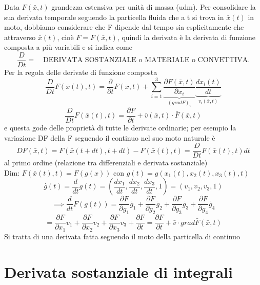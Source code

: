 \documentclass[a4paper,11pt]{report}
\newcommand{\x}{\bar{x}}
\newcommand{\xt}{\bar{x}(t)}
\newcommand{\vel}{\bar{v}}
\begin{document}
		Data $F(\x,t)$ grandezza estensiva per unità di massa (udm). Per consolidare la sua derivata temporale seguendo la particella fluida che a t si trova in $\x(t)$ in moto, dobbiamo considerare che F dipende dal tempo sia esplicitamente che attraverso $\x(t)$, cioè $F=F(\x,t)$, quindi la derivata è la derivata di funzione composta a più variabili e si indica come 
		$$
		\dfrac{D}{Dt} =\quad \textrm{DERIVATA SOSTANZIALE o MATERIALE o CONVETTIVA}.
		$$
		Per la regola delle derivate di funzione composta
		$$
		\dfrac{D}{Dt} F(\xt,t) = \dfrac{\partial}{\partial t}F(\x,t) + \sum_{i=1}^{3} \underset{(grad F)_i}{\underbrace{\dfrac{\partial F(\x,t)}{\partial x_i}}} \underset{v_i(\x,t)}{\underbrace{\dfrac{dx_i(t)}{dt}}}
		$$
		\begin{equation}
			\dfrac{D}{Dt} F(\xt,t) = \dfrac{\partial F}{\partial t} + \bar{v}(\x,t) \cdot \bar{F}(\x,t)
		\end{equation}
		e questa gode delle proprietà di tutte le derivate ordinarie; per esempio la variazione DF della F seguendo il continuo nel suo moto naturale è
		\begin{equation}
			DF(\x,t) = F(\x(t+dt),t+dt) - F(\xt,t) = \dfrac{D}{Dt} F(\xt,t) dt
		\end{equation}
		al primo ordine (relazione tra differenziali e derivata sostanziale)\\
		Dim: $F(\xt,t) = F(g(x))$ con $g(t) = g(x_1(t),x_2(t),x_3(t),t)$
		$$
		\overset{\cdot}{g}(t) = \dfrac{d}{dt} g(t) = \left(\dfrac{dx_1}{dt},\dfrac{dx_2}{dt},\dfrac{dx_3}{dt},1\right) = (v_1,v_2,v_3,1)
		$$
		$$
		\implies \dfrac{d}{dt}F(g(t)) = \dfrac{\partial F}{\partial g_1}\overset{\cdot}{g}_1 + \dfrac{\partial F}{\partial g_2}\overset{\cdot}{g}_2 + \dfrac{\partial F}{\partial g_3}\overset{\cdot}{g}_3 + \dfrac{\partial F}{\partial g_4}\overset{\cdot}{g}_4 
		$$
		$$
		 = \dfrac{\partial F}{\partial x_1}v_1 + \dfrac{\partial F}{\partial x_2}v_2 + \dfrac{\partial F}{\partial x_3}v_3 + \dfrac{\partial F}{\partial t} = \dfrac{\partial F}{\partial t} + \vel \cdot grad \bar{F}(\x,t)
		$$
		Si tratta di una derivata fatta seguendo il moto della particella di continuo
		
	

\chapter{Derivata sostanziale di integrali}
\end{document}
